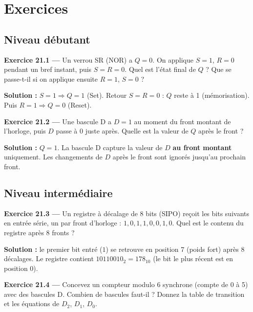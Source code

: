 \documentclass[12pt,a4paper,twoside]{book}
\begin{document}
\section*{Exercices}

\subsection*{Niveau débutant}

\textbf{Exercice 21.1 ---} Un verrou SR (NOR) a $Q = 0$. On applique $S = 1$, $R = 0$ pendant un bref instant, puis $S = R = 0$. Quel est l'état final de $Q$ ? Que se passe-t-il si on applique ensuite $R = 1$, $S = 0$ ?

\begin{pratique}
\textbf{Solution :} $S = 1 \Rightarrow Q = 1$ (Set). Retour $S = R = 0$ : $Q$ reste à 1 (mémorisation). Puis $R = 1 \Rightarrow Q = 0$ (Reset).
\end{pratique}

\textbf{Exercice 21.2 ---} Une bascule D a $D = 1$ au moment du front montant de l'horloge, puis $D$ passe à 0 juste après. Quelle est la valeur de $Q$ après le front ?

\begin{pratique}
\textbf{Solution :} $Q = 1$. La bascule D capture la valeur de $D$ \textbf{au front montant} uniquement. Les changements de $D$ après le front sont ignorés jusqu'au prochain front.
\end{pratique}

\subsection*{Niveau intermédiaire}

\textbf{Exercice 21.3 ---} Un registre à décalage de 8 bits (SIPO) reçoit les bits suivants en entrée série, un par front d'horloge : $1, 0, 1, 1, 0, 0, 1, 0$. Quel est le contenu du registre après 8 fronts ?

\begin{pratique}
\textbf{Solution :} le premier bit entré ($1$) se retrouve en position 7 (poids fort) après 8 décalages. Le registre contient $10110010_2 = 178_{10}$ (le bit le plus récent est en position 0).
\end{pratique}

\textbf{Exercice 21.4 ---} Concevez un compteur modulo 6 synchrone (compte de 0 à 5) avec des bascules D. Combien de bascules faut-il ? Donnez la table de transition et les équations de $D_2$, $D_1$, $D_0$.
\end{document}
